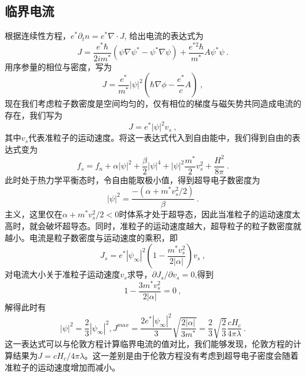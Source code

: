 \subsection{临界电流}
根据连续性方程，$e^*\partial_t n = e^*\nabla \cdot J$, 给出电流的表达式为
\begin{equation}
J = \frac{e^*\hbar}{2im^*}(\psi \nabla \psi^* - \psi^* \nabla \psi) + \frac{e^{*2}\hbar}{m^*} A \psi^* \psi~.
\end{equation}
用序参量的相位与密度，写为
\begin{equation}
J = \frac{e^*}{m^*} |\psi|^2 (\hbar \nabla \phi - \frac{e^*}{c}A) \label{eq_gl_2}~,
\end{equation}
现在我们考虑粒子数密度是空间均匀的，仅有相位的梯度与磁矢势共同造成电流的存在，我们写为
\begin{equation}
J = e^* |\psi|^2 v_s~,
\end{equation}
其中$v_s$代表准粒子的运动速度。将这一表达式代入到自由能中，我们得到自由的表达式变为
\begin{equation}
f_s = f_n + \alpha |\psi|^2 + \frac{\beta}{2}|\psi|^4 + |\psi|^2 \frac{m^*}{2} v_s^2 + \frac{H^2}{8\pi}~.
\end{equation}
此时处于热力学平衡态时，令自由能取极小值，得到超导电子数密度为
\begin{equation}
|\psi|^2 = \frac{-(\alpha + m^* v_s^2/2)}{\beta}~.
\end{equation}
主义，这里仅在$\alpha+m^* v_s^2/2 <0$时体系才处于超导态，因此当准粒子的运动速度太高时，就会破坏超导态。同时，准粒子的运动速度越大，超导粒子的粒子数密度就越小。电流是粒子数密度与运动速度的乘积，即
\begin{equation}
J_s = e^* |\psi_{\infty}|^2 (1-\frac{m^* v_s^2}{2|\alpha|})v_s ~,
\end{equation}
对电流大小关于准粒子运动速度$v_s$求导，$\partial J_s /\partial v_s = 0$,得到
\begin{equation}
1-\frac{3 m^* v_s^2}{2 |\alpha|} =0 ~,
\end{equation}
解得此时有
\begin{equation}
|\psi|^2 = \frac{2}{3}|\psi_{\infty}|^2, J^{max} = \frac{2e^* |\psi_{\infty}|^2}{3} \sqrt{\frac{2|\alpha|}{3m^*}} = \frac{2}{3}\sqrt{\frac{2}{3}}\frac{c H_c}{4\pi \lambda}~.
\end{equation}
这一表达式可以与伦敦方程计算临界电流的值对比，我们能够发现，伦敦方程的计算结果为$J= c H_c/4\pi \lambda$。这一差别是由于伦敦方程没有考虑到超导电子密度会随着准粒子的运动速度增加而减小。


